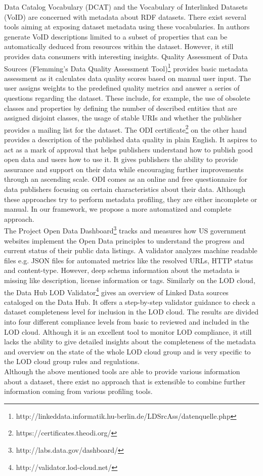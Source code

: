 \documentclass[runningheads,a4paper]{llncs}
\begin{document}
Data Catalog Vocabulary (DCAT) \cite{Erickson:14:DCV} and the Vocabulary of Interlinked Datasets (VoID) \cite{Cyganiak:11:DLD} are concerned with metadata about RDF datasets. There exist several tools aiming at exposing dataset metadata using these vocabularies. In \cite{BoHm:2011:CVD:2030805.2031001} authors generate VoID descriptions limited to a subset of properties that can be automatically deduced from resources within the dataset. However, it still provides data consumers with interesting insights. Quality Assessment of Data Sources (Flemming's Data Quality Assessment Tool)\footnote{http://linkeddata.informatik.hu-berlin.de/LDSrcAss/datenquelle.php} provides basic metadata assessment as it calculates data quality scores based on manual user input. The user assigns weights to the predefined quality metrics and answer a series of questions regarding the dataset. These include, for example, the use of obsolete classes and properties by defining the number of described entities that are assigned disjoint classes, the usage of stable URIs and whether the publisher provides a mailing list for the dataset. The ODI certificate\footnote {https://certificates.theodi.org/} on the other hand provides a description of the published data quality in plain English. It aspires to act as a mark of approval that helps publishers understand how to publish good open data and users how to use it. It gives publishers the ability to provide assurance and support on their data while encouraging further improvements through an ascending scale. ODI comes as an online and free questionnaire for data publishers focusing on certain characteristics about their data. Although these approaches try to perform metadata profiling, they are either incomplete or manual. In our framework, we propose a more automatized and complete approach.\\
The Project Open Data Dashboard\footnote{http://labs.data.gov/dashboard/} tracks and measures how US government websites implement the Open Data principles to understand the progress and current status of their public data listings. A validator analyzes machine readable files e.g. JSON files for automated metrics like the resolved URLs, HTTP status and content-type. However, deep schema information about the metadata is missing like description, license information or tags. Similarly on the LOD cloud, the Data Hub LOD Validator\footnote{http://validator.lod-cloud.net/} gives an overview of Linked Data sources cataloged on the Data Hub. It offers a step-by-step validator guidance to check a dataset completeness level for inclusion in the LOD cloud. The results are divided into four different compliance levels from basic to reviewed and included in the LOD cloud. Although it is an excellent tool to monitor LOD compliance, it still lacks the ability to give detailed insights about the completeness of the metadata and overview on the state of the whole LOD cloud group and is very specific to the LOD cloud group rules and regulations.\\
Although the above mentioned tools are able to provide various information about a dataset, there exist no approach that is extensible to combine further information coming from various profiling tools.
\end{document}
